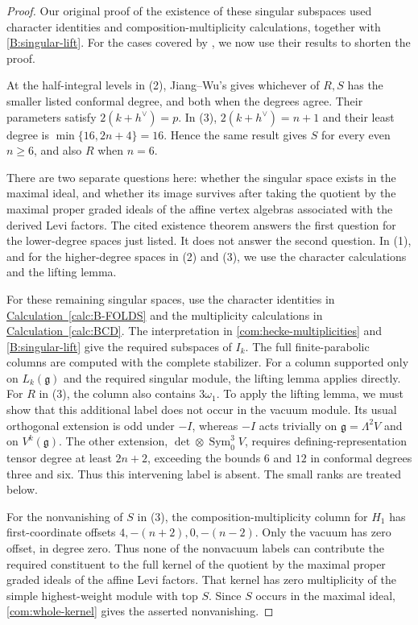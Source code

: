 \documentclass[11pt,a4paper]{amsart}
\numberwithin{equation}{section}
\theoremstyle{definition}
\theoremstyle{remark}
\newcommand{\g}{\mathfrak g}
\newcommand{\Sym}{\operatorname{Sym}}
\begin{document}
\begin{proof}
%
Our original proof of the existence of these singular subspaces
used character identities and composition-multiplicity calculations,
together with \cref{B:singular-lift}. For the cases covered by
\cite[Theorem~4.8(5) and Corollary~5.11]{JiangWu2026},
we now use their results to shorten the proof.

%
At the half-integral levels in (2), Jiang--Wu's
\cite[Theorem~4.8(5) and Corollary~5.11]{JiangWu2026} gives
whichever of $R,S$ has the smaller listed conformal degree, and both
when the degrees agree. Their parameters satisfy $2(k+h^\vee)=p$.
In (3), $2(k+h^\vee)=n+1$ and their least degree is
$\min\{16,2n+4\}=16$. Hence the same result gives $S$ for every
even $n\ge6$, and also $R$ when $n=6$.

There are two separate questions here: whether the singular space
exists in the maximal ideal, and whether its image survives after
taking the quotient by the maximal proper graded ideals of the
affine vertex algebras associated with the derived Levi factors. The cited existence theorem answers the first
question for the lower-degree spaces just listed. It does not answer
the second question. In (1), and for the higher-degree spaces in (2)
and (3), we use the character calculations and the lifting lemma.

For these remaining singular spaces, use the character identities in
\hyperref[calc:B-FOLDS]{Calculation~\ref*{calc:B-FOLDS}} and the
multiplicity calculations in
\hyperref[calc:BCD]{Calculation~\ref*{calc:BCD}}.
The interpretation in \cref{com:hecke-multiplicities}
and \cref{B:singular-lift} give the required subspaces of $I_k$.
The full finite-parabolic columns are computed with the complete stabilizer.
For a column supported only on $L_k(\g)$ and the required singular
module, the lifting lemma applies directly. For $R$ in (3), the column
also contains $3\omega_1$. To apply the lifting lemma, we must show
that this additional label does not occur in the vacuum module.
Its usual orthogonal extension is odd under $-I$, whereas $-I$ acts
trivially on $\g=\Lambda^2V$ and on $V^k(\g)$.
The other extension, $\det\otimes\Sym^3_0V$, requires defining-representation
tensor degree at least $2n+2$, exceeding the bounds $6$ and $12$
in conformal degrees three and six. Thus this intervening label is absent.
The small ranks are treated below.

For the nonvanishing of $S$ in (3), the composition-multiplicity
column for $H_1$ has first-coordinate offsets
$4,-(n+2),0,-(n-2)$. Only the vacuum has zero offset, in degree zero.
Thus none of the nonvacuum labels can contribute the required
constituent to the full kernel of the quotient by the maximal proper
graded ideals of the affine Levi factors. That kernel has zero
multiplicity of the simple highest-weight module with top $S$.
Since $S$ occurs in the maximal ideal, \cref{com:whole-kernel}
gives the asserted nonvanishing.


\end{proof}
\end{document}
